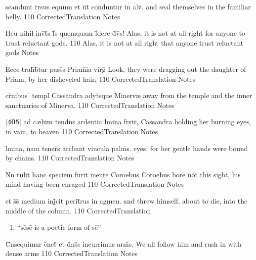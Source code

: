 \latline
  {scandunt r\={}rsus equum et n\={}t\={} conduntur in alv\={}.}
  { and seal themselves in the familiar belly. }
  {110}
  { CorrectedTranslation }
  { Notes }


\latline
  {Heu nihil inv\={\macron {\i}}t\={\macron {\i}}s f\={}s quemquam f\={\macron {\i}}dere d\={\macron {\i}}v\={\macron {\i}}s!}
  { Alas, it is not at all right for anyone to trust reluctant gods. }
  {110}
  { Alas, it is not at all right that anyone trust reluctant gods}
  { Notes }


\latline
  {Ecce trah\={}b\={}tur pass\={\macron {\i}}s Priam\={}ia virg\={}}
  { Look, they were dragging out the daughter of Priam, by her disheveled hair,  }
  {110}
  { CorrectedTranslation }
  { Notes }


\latline
  {cr\={\macron {\i}}nibus \={} templ\={} Cassandra adyt\={\macron {\i}}sque Minerv{\ae}}
  { away from the temple and the inner sanctuaries of Minerva,}
  {110}
  { CorrectedTranslation }
  { Notes }


\latline
  {[\textbf{405}] ad c{\ae}lum tend\={}ns ardentia l\={}mina fr\={}str\={},}
  { Cassandra holding her burning eyes, in vain, to heaven }
  {110}
  { CorrectedTranslation }
  { Notes }


\latline
  {l\={}mina, nam tener\={}s arc\={}bant vincula palm\={}s.}
  { eyes, for her gentle hands were bound by chains. }
  {110}
  { CorrectedTranslation }
  { Notes }


\latline
  {N\={}n tulit hanc speciem furi\={}t\={} mente Coroebus}
  { Coroebus bore not this sight, his mind having been enraged }
  {110}
  { CorrectedTranslation }
  { Notes }


\latline
  {et s\={}s\={} medium inj\={}cit perit\={}rus in agmen.}
  { and threw himself, about to die, into the middle of the column. }
  {110}
  { CorrectedTranslation }
  { \begin{enumerate}
  	\item ``s\={e}s\={e} is a poetic form of s\={e}''
  \end{enumerate} }


\latline
  {C\={}nsequimur c\={}nct\={\macron {\i}} et d\={}ns\={\macron {\i}}s incurrimus arm\={\macron {\i}}s.}
  { We all follow him and rush in with dense arms }
  {110}
  { CorrectedTranslation }
  { Notes }


